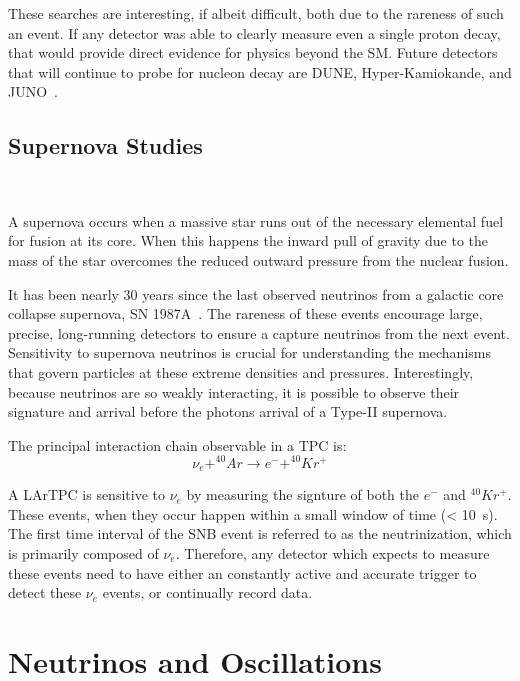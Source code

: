 These searches are interesting, if albeit difficult, both due to the rareness of such an event.
If any detector was able to clearly measure even a single proton decay, that would provide direct evidence for physics beyond the SM.
Future detectors that will continue to probe for nucleon decay are DUNE, Hyper-Kamiokande, and JUNO~\citep{DUNE_TDR_V1_Abi_2020, https://doi.org/10.48550/arxiv.1805.04163, Juno:2022103927}.

\subsection{Supernova Studies}~\label{sec:intro_supernova}

A supernova occurs when a massive star runs out of the necessary elemental fuel for fusion at its core.
When this happens the inward pull of gravity due to the mass of the star overcomes the reduced outward pressure from the nuclear fusion.

It has been nearly 30 years since the last observed neutrinos from a galactic core collapse supernova, SN 1987A~\citep{1987ApJ...322..795F}.
The rareness of these events encourage large, precise, long-running detectors to ensure a capture neutrinos from the next event.
Sensitivity to supernova neutrinos is crucial for understanding the mechanisms that govern particles at these extreme densities and pressures.
Interestingly, because neutrinos are so weakly interacting, it is possible to observe their signature and arrival before the photons arrival of a Type-II supernova.

The principal interaction chain observable in a TPC is:
\begin{equation}
    \nu_{e} + ^{40}Ar \rightarrow e^- + ^{40}Kr^{+}
\end{equation}

A LArTPC is sensitive to $\nu_{e}$ by measuring the signture of both the $e^{-}$ and $^{40}Kr^{+}$.
These events, when they occur happen within a small window of time (< 10~\unit{s}).
The first time interval of the SNB event is referred to as the neutrinization, which is primarily composed of $\nu_{e}$.
Therefore, any detector which expects to measure these events need to have either an constantly active and accurate trigger to detect these $\nu_{e}$ events, or continually record data.

\section{Neutrinos and Oscillations}~\label{sec:neutrino_oscillation}

